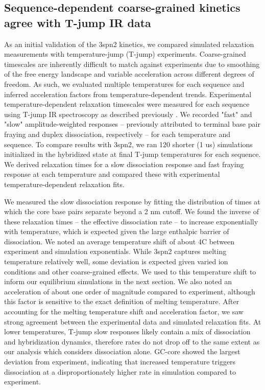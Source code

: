\documentclass[journal=jpcbfk,manuscript=article]{achemso}
\begin{document}

\subsection{Sequence-dependent coarse-grained kinetics agree with T-jump IR data}


As an initial validation of the 3spn2 kinetics, we compared simulated relaxation measurements with temperature-jump (T-jump) experiments. Coarse-grained timescales are inherently difficult to match against experiments due to smoothing of the free energy landscape and variable acceleration across different degrees of freedom. As such, we evaluated multiple temperatures for each sequence and inferred acceleration factors from temperature-dependent trends.  Experimental temperature-dependent relaxation timescales were measured for each sequence using T-jump IR spectroscopy as described previously \citep{Sanstead2018DirectDehybridization}. We recorded "fast" and "slow" amplitude-weighted responses -- previously attributed to terminal base pair fraying and duplex dissociation, respectively -- for each temperature and sequence. To compare results with 3spn2, we ran 120 shorter (1 us) simulations initialized in the hybridized state at final T-jump temperatures for each sequence. We derived relaxation times for a slow dissociation response and fast fraying response at each temperature and compared these with experimental temperature-dependent relaxation fits.

We measured the slow dissociation response by fitting the distribution of times at which the core base pairs separate beyond a 2 nm cutoff. We found the inverse of these relaxation times -- the effective dissociation rate -- to increase exponentially with temperature, which is expected given the large enthalpic barrier of dissociation. We noted an average temperature shift of about 4C between experiment and simulation exponentials. While 3spn2 captures melting temperature relatively well, some deviation is expected given varied ion conditions and other coarse-grained effects. We used to this temperature shift to inform our equilibrium simulations in the next section. We also noted an acceleration of about one order of magnitude compared to experiment, although this factor is sensitive to the exact definition of melting temperature. After accounting for the melting temperature shift and acceleration factor, we saw strong agreement between the experimental data and simulated relaxation fits. At lower temperatures, T-jump slow responses likely contain a mix of dissociation and hybridization dynamics, therefore rates do not drop off to the same extent as our analysis which considers dissociation alone. GC-core showed the largest deviation from experiment, indicating that increased temperature triggers dissociation at a disproportionately higher rate in simulation compared to experiment. 
\end{document}
